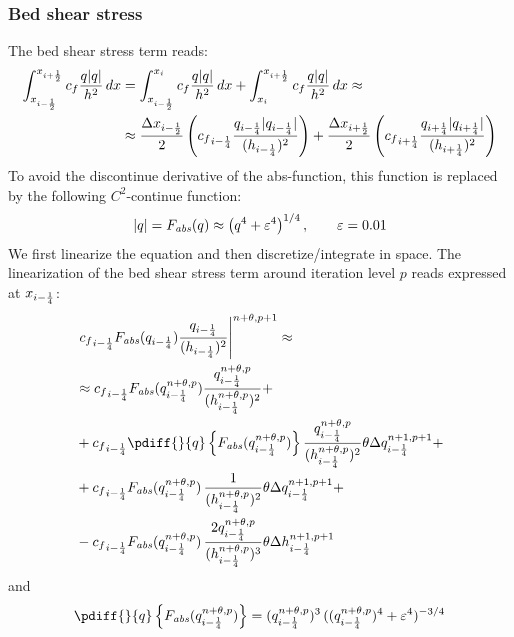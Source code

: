 \subsubsection{Bed shear stress}
The bed shear stress term reads:
\begin{align}
    \int_{x_{i-\frac{1}{2}}}^{x_{i+\frac{1}{2}}} c_f\frac{q\lvert q \rvert}{h^2} \,dx  & = \int_{x_{i-\frac{1}{2}}}^{x_{i}} c_f\frac{q\lvert q \rvert}{h^2} \,dx +
    \int_{x_{i}}^{x_{i+\frac{1}{2}}} c_f\frac{q\lvert q \rvert}{h^2} \,dx \approx
    \\
    & \approx \frac{\Delta x_{i-\frac{1}{2}}}{2} \left( {c_f}_{i-\frac{1}{4}}\frac{q_{i-\frac{1}{4}}\lvert q_{i-\frac{1}{4}} \rvert}{(h_{i-\frac{1}{4}})^2}  \right)  +
    \frac{\Delta x_{i+\frac{1}{2}}}{2} \left( {c_f}_{i+\frac{1}{4}}\frac{q_{i+\frac{1}{4}}\lvert q_{i+\frac{1}{4}} \rvert}{(h_{i+\frac{1}{4}})^2} \right)
\end{align}
To avoid the discontinue derivative of the abs-function, this function is replaced by the following  $C^2$-continue function:
\begin{align}
    \lvert q \rvert = F_{\it abs}(q) \approx \left( q^4 + \varepsilon^4 \right)^{1/4}, \qquad \varepsilon = 0.01
    \label{eq:continue_abs}
\end{align}
We first linearize the equation and then discretize/integrate in space.
The linearization of the bed shear stress term around iteration level $p$ reads expressed at $x_{i-\frac{1}{4}}$:
%
\begin{align}
    & \left.  {c_f}_{i-\quart} \Fabs{q_{i-\quart}} \frac{q_{i-\quart}}{(h_{i-\quart})^2} \right|^{n+\theta, p+1} \approx
    \\
    & \approx {c_f}_{i-\quart} \Fabs{q^{n+\theta, p}_{i-\quart}}  \frac{q^{n+\theta, p}_{i-\quart}}{(h^{n+\theta, p}_{i-\quart})^2} +
    \nonumber \\
    & + {c_f}_{i-\quart} \pdiff{}{q}\left\{ \Fabs{q^{n+\theta, p}_{i-\quart}} \right\}   \frac{q^{n+\theta, p}_{i-\quart}}{(h^{n+\theta, p}_{i-\quart})^2} \theta \Delta q^{n+1, p+1}_{i-\quart} +
    \nonumber \\
    & + {c_f}_{i-\quart} \Fabs{q^{n+\theta, p}_{i-\quart}}\,  \frac{ 1 }{ (h^{n+\theta, p}_{i-\quart})^2 } \theta \Delta q^{n+1, p+1}_{i-\quart} +
    \nonumber \\
    & - {c_f}_{i-\quart} \Fabs{q^{n+\theta, p}_{i-\quart}}\, \frac{2 q^{n+\theta, p}_{i-\quart}}{(h^{n+\theta, p}_{i-\quart})^3} \theta \Delta h^{n+1, p+1}_{i-\quart}
\end{align}
and
\begin{align}
    \pdiff{}{q}\left\{ \Fabs{q^{n+\theta, p}_{i-\quart}} \right\} =
    (q^{n+\theta, p}_{i-\quart})^3\,((q^{n+\theta, p}_{i-\quart})^4 + \eps^4)^{-3/4}
\end{align}
